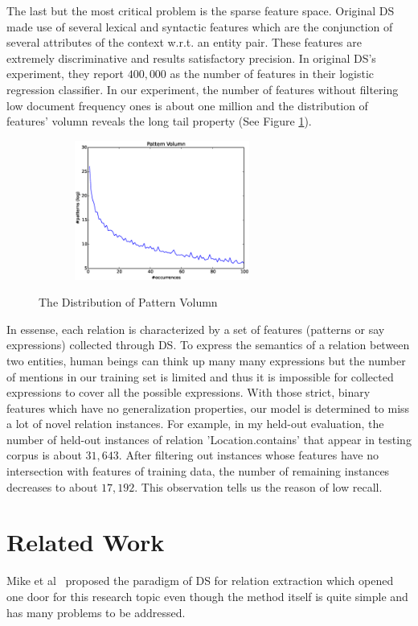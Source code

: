 \documentclass[10pt]{article} %
\theoremstyle{definition}
\theoremstyle{definition}
\begin{document}
The last but the most critical problem is the sparse feature space. 
Original DS made use of several lexical and syntactic features which are the conjunction of several attributes of the context w.r.t. an entity pair. 
These features are extremely discriminative and results satisfactory precision. 
In original DS's experiment, they report $400,000$ as the number of features in their logistic regression classifier. 
In our experiment, the number of features without filtering low document frequency ones is about one million and the distribution of features' volumn reveals the long tail property (See Figure \ref{fig:pv}). 
\begin{figure}
\centering
\includegraphics[width=3.2in,height=1.8in]{pv.eps}
\label{fig:pv}
\caption{The Distribution of Pattern Volumn}
\end{figure}
In essense, each relation is characterized by a set of features (patterns or say expressions) collected through DS. 
To express the semantics of a relation between two entities, human beings can think up many many expressions 
but the number of mentions in our training set is limited and thus it is impossible for collected expressions to cover all the possible expressions. 
With those strict, binary features which have no generalization properties, our model is determined to miss a lot of novel relation instances. 
For example, in my held-out evaluation, the number of held-out instances of relation 'Location.contains' that appear in testing corpus is about $31,643$. 
After filtering out instances whose features have no intersection with features of training data, the number of remaining instances decreases to about $17,192$. 
This observation tells us the reason of low recall. 



\section{Related Work}
Mike et al~\cite{mintz} proposed the paradigm of DS for relation extraction which opened one door for this research topic even though the method itself is quite simple and has many problems to be addressed. 
\end{document}
